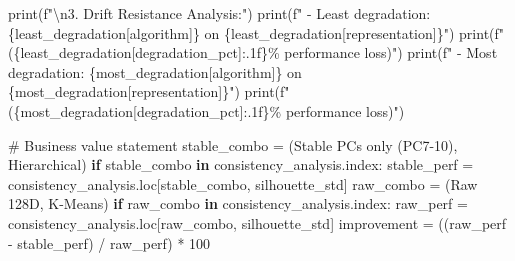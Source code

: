 \documentclass[
  letterpaper,
  DIV=11,
  numbers=noendperiod]{scrartcl}
\newenvironment{Shaded}{\begin{snugshade}}{\end{snugshade}}
\newcommand{\BuiltInTok}[1]{\textcolor[rgb]{0.00,0.23,0.31}{#1}}
\newcommand{\CharTok}[1]{\textcolor[rgb]{0.13,0.47,0.30}{#1}}
\newcommand{\CommentTok}[1]{\textcolor[rgb]{0.37,0.37,0.37}{#1}}
\newcommand{\ControlFlowTok}[1]{\textcolor[rgb]{0.00,0.23,0.31}{\textbf{#1}}}
\newcommand{\DecValTok}[1]{\textcolor[rgb]{0.68,0.00,0.00}{#1}}
\newcommand{\KeywordTok}[1]{\textcolor[rgb]{0.00,0.23,0.31}{\textbf{#1}}}
\newcommand{\NormalTok}[1]{\textcolor[rgb]{0.00,0.23,0.31}{#1}}
\newcommand{\OperatorTok}[1]{\textcolor[rgb]{0.37,0.37,0.37}{#1}}
\newcommand{\SpecialCharTok}[1]{\textcolor[rgb]{0.37,0.37,0.37}{#1}}
\newcommand{\SpecialStringTok}[1]{\textcolor[rgb]{0.13,0.47,0.30}{#1}}
\newcommand{\StringTok}[1]{\textcolor[rgb]{0.13,0.47,0.30}{#1}}
\renewenvironment{Shaded}{%
  \begin{tcolorbox}[%
    enhanced,%
    colback=codebg,%
    colframe=codebg,%
    borderline west={3pt}{0pt}{sectionblue},%
    fontupper=\small\ttfamily,%
    boxrule=0pt,%
    arc=0pt,%
    boxsep=5pt,%
    left=2mm,%
    right=2mm,%
    top=2mm,%
    bottom=2mm%
  ]%
}{%
  \end{tcolorbox}%
}
\begin{document}
\begin{Shaded}
\begin{Highlighting}[]
    \BuiltInTok{print}\NormalTok{(}\SpecialStringTok{f"}\CharTok{\textbackslash{}n}\SpecialStringTok{3. Drift Resistance Analysis:"}\NormalTok{)}
    \BuiltInTok{print}\NormalTok{(}\SpecialStringTok{f"   {-} Least degradation: }\SpecialCharTok{\{}\NormalTok{least\_degradation[}\StringTok{\textquotesingle{}algorithm\textquotesingle{}}\NormalTok{]}\SpecialCharTok{\}}\SpecialStringTok{ on }\SpecialCharTok{\{}\NormalTok{least\_degradation[}\StringTok{\textquotesingle{}representation\textquotesingle{}}\NormalTok{]}\SpecialCharTok{\}}\SpecialStringTok{"}\NormalTok{)}
    \BuiltInTok{print}\NormalTok{(}\SpecialStringTok{f"     (}\SpecialCharTok{\{}\NormalTok{least\_degradation[}\StringTok{\textquotesingle{}degradation\_pct\textquotesingle{}}\NormalTok{]}\SpecialCharTok{:.1f\}}\SpecialStringTok{\% performance loss)"}\NormalTok{)}
    \BuiltInTok{print}\NormalTok{(}\SpecialStringTok{f"   {-} Most degradation: }\SpecialCharTok{\{}\NormalTok{most\_degradation[}\StringTok{\textquotesingle{}algorithm\textquotesingle{}}\NormalTok{]}\SpecialCharTok{\}}\SpecialStringTok{ on }\SpecialCharTok{\{}\NormalTok{most\_degradation[}\StringTok{\textquotesingle{}representation\textquotesingle{}}\NormalTok{]}\SpecialCharTok{\}}\SpecialStringTok{"}\NormalTok{)}
    \BuiltInTok{print}\NormalTok{(}\SpecialStringTok{f"     (}\SpecialCharTok{\{}\NormalTok{most\_degradation[}\StringTok{\textquotesingle{}degradation\_pct\textquotesingle{}}\NormalTok{]}\SpecialCharTok{:.1f\}}\SpecialStringTok{\% performance loss)"}\NormalTok{)}

\CommentTok{\# Business value statement}
\NormalTok{stable\_combo }\OperatorTok{=}\NormalTok{ (}\StringTok{\textquotesingle{}Stable PCs only (PC7{-}10)\textquotesingle{}}\NormalTok{, }\StringTok{\textquotesingle{}Hierarchical\textquotesingle{}}\NormalTok{)}
\ControlFlowTok{if}\NormalTok{ stable\_combo }\KeywordTok{in}\NormalTok{ consistency\_analysis.index:}
\NormalTok{    stable\_perf }\OperatorTok{=}\NormalTok{ consistency\_analysis.loc[stable\_combo, }\StringTok{\textquotesingle{}silhouette\_std\textquotesingle{}}\NormalTok{]}
\NormalTok{    raw\_combo }\OperatorTok{=}\NormalTok{ (}\StringTok{\textquotesingle{}Raw 128D\textquotesingle{}}\NormalTok{, }\StringTok{\textquotesingle{}K{-}Means\textquotesingle{}}\NormalTok{)}
    \ControlFlowTok{if}\NormalTok{ raw\_combo }\KeywordTok{in}\NormalTok{ consistency\_analysis.index:}
\NormalTok{        raw\_perf }\OperatorTok{=}\NormalTok{ consistency\_analysis.loc[raw\_combo, }\StringTok{\textquotesingle{}silhouette\_std\textquotesingle{}}\NormalTok{]}
\NormalTok{        improvement }\OperatorTok{=}\NormalTok{ ((raw\_perf }\OperatorTok{{-}}\NormalTok{ stable\_perf) }\OperatorTok{/}\NormalTok{ raw\_perf) }\OperatorTok{*} \DecValTok{100}
        

\end{Highlighting}
\end{Shaded}
\end{document}
